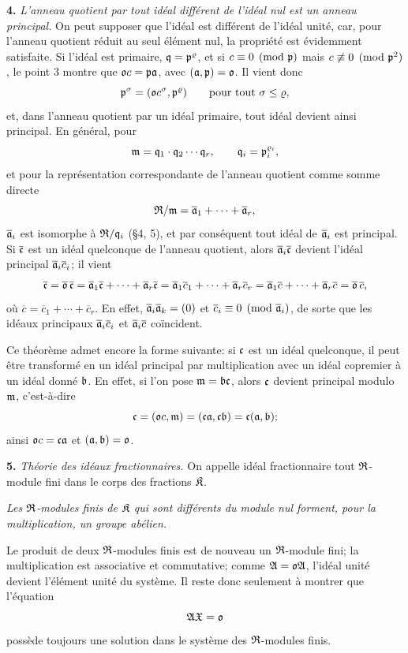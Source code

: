 \textbf{4.} \emph{L'anneau quotient par tout idéal différent de l'idéal nul est un anneau principal.} On peut supposer que l'idéal est différent de l'idéal unité, car, pour l'anneau quotient réduit au seul élément nul, la propriété est évidemment satisfaite. Si l'idéal est primaire, $\mathfrak{q}=\mathfrak{p}^\varrho$, et si $c\equiv0\pmod{\mathfrak{p}}$ mais $c\not\equiv0\pmod{\mathfrak{p}^2}$, le point 3 montre que $\mathfrak{o} c=\mathfrak{p}\mathfrak{a}$, avec $(\mathfrak{a},\mathfrak{p})=\mathfrak{o}$. Il vient donc
\[
        \mathfrak{p}^\sigma=(\mathfrak{o} c^\sigma,\mathfrak{p}^\varrho)
        \qquad\text{pour tout }\sigma\le\varrho,
\]
et, dans l'anneau quotient par un idéal primaire, tout idéal devient ainsi principal. En général, pour
\[
        \mathfrak{m}=\mathfrak{q}_1\cdot\mathfrak{q}_2\cdots\mathfrak{q}_r,
        \qquad \mathfrak{q}_i=\mathfrak{p}_i^{\varrho_i},
\]
et pour la représentation correspondante de l'anneau quotient comme somme directe
\[
        \mathfrak{R}/\mathfrak{m}=\overline{\mathfrak{a}}_1+\cdots+\overline{\mathfrak{a}}_r,
\]
$\overline{\mathfrak{a}}_i$ est isomorphe à $\mathfrak{R}/\mathfrak{q}_i$ (\S{}4, 5), et par conséquent tout idéal de $\overline{\mathfrak{a}}_i$ est principal. Si $\overline{\mathfrak{c}}$ est un idéal quelconque de l'anneau quotient, alors $\overline{\mathfrak{a}}_i\overline{\mathfrak{c}}$ devient l'idéal principal $\overline{\mathfrak{a}}_i\overline c_i$; il vient
\[
\overline{\mathfrak{c}}
=\overline{\mathfrak{o}}\,\overline{\mathfrak{c}}
=\overline{\mathfrak{a}}_1\overline{\mathfrak{c}}+\cdots+\overline{\mathfrak{a}}_r\overline{\mathfrak{c}}
=\overline{\mathfrak{a}}_1\overline c_1+\cdots+\overline{\mathfrak{a}}_r\overline c_r
=\overline{\mathfrak{a}}_1\overline c+\cdots+\overline{\mathfrak{a}}_r\overline c
=\overline{\mathfrak{o}}\,\overline c,
\]
où $\overline c=\overline c_1+\cdots+\overline c_r$. En effet,
$\overline{\mathfrak{a}}_i\overline{\mathfrak{a}}_k=(0)$ et
$\overline c_i\equiv0\pmod{\overline{\mathfrak{a}}_i}$, de sorte que les idéaux principaux
$\overline{\mathfrak{a}}_i\overline c_i$ et $\overline{\mathfrak{a}}_i\overline c$ coïncident.

Ce théorème admet encore la forme suivante: si $\mathfrak{c}$ est un idéal quelconque, il peut être transformé en un idéal principal par multiplication avec un idéal copremier à un idéal donné $\mathfrak{b}$. En effet, si l'on pose $\mathfrak{m}=\mathfrak{b}\mathfrak{c}$, alors $\mathfrak{c}$ devient principal modulo $\mathfrak{m}$, c'est-à-dire
\[
        \mathfrak{c}=(\mathfrak{o} c,\mathfrak{m})=(\mathfrak{c}\mathfrak{a},\mathfrak{c}\mathfrak{b})=\mathfrak{c}(\mathfrak{a},\mathfrak{b});
\]
ainsi $\mathfrak{o} c=\mathfrak{c}\mathfrak{a}$ et $(\mathfrak{a},\mathfrak{b})=\mathfrak{o}$.

\textbf{5.} \emph{Théorie des idéaux fractionnaires.} On appelle idéal fractionnaire tout $\mathfrak{R}$-module fini dans le corps des fractions $\mathfrak{K}$.

\emph{Les $\mathfrak{R}$-modules finis de $\mathfrak{K}$ qui sont différents du module nul forment, pour la multiplication, un groupe abélien.}

Le produit de deux $\mathfrak{R}$-modules finis est de nouveau un $\mathfrak{R}$-module fini; la multiplication est associative et commutative; comme $\mathfrak A=\mathfrak{o}\mathfrak A$, l'idéal unité devient l'élément unité du système. Il reste donc seulement à montrer que l'équation
\[
        \mathfrak A\mathfrak{X}=\mathfrak{o}
\]
possède toujours une solution dans le système des $\mathfrak{R}$-modules finis.

